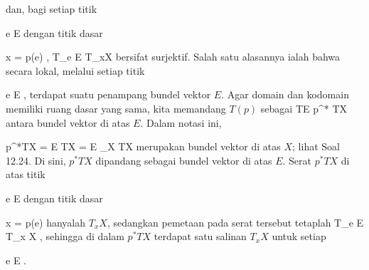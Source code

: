 dan, bagi setiap titik

\mavergleichskette
{\vergleichskette
{ e
}
{ \in }{ E
}
{  }{
}
{    }{
}
{   }{
}
}
{}{}{}
dengan titik dasar

\mavergleichskette
{\vergleichskette
{ x
}
{ = }{ p(e)
}
{  }{
}
{    }{
}
{   }{
}
}
{}{}{,}
 {T_e E} { T_{x}X
} {}
bersifat surjektif. Salah satu alasannya ialah bahwa secara lokal, melalui setiap titik

\mavergleichskette
{\vergleichskette
{ e
}
{ \in }{ E
}
{  }{
}
{    }{
}
{   }{
}
}
{}{}{,}
terdapat suatu penampang bundel vektor $E$. Agar domain dan kodomain memiliki ruang dasar yang sama, kita memandang $T(p)$ sebagai
 {TE} { p^* TX
} {}
antara bundel vektor di atas $E$. Dalam notasi ini,

\mavergleichskettedisp
{\vergleichskette
{ p^*TX
}
{ =} { E \oplus TX
}
{ =} { E \times_X TX
}
{ } {
}
{ } {
}
}
{}{}{}
merupakan
bundel vektor di atas $X$; lihat
Soal 12.24.
Di sini, $p^*TX$ dipandang sebagai bundel vektor di atas $E$. Serat $p^*TX$ di atas titik

\mavergleichskette
{\vergleichskette
{ e
}
{ \in }{ E
}
{  }{
}
{    }{
}
{   }{
}
}
{}{}{}
dengan titik dasar

\mavergleichskette
{\vergleichskette
{ x
}
{ = }{ p(e)
}
{  }{
}
{    }{
}
{   }{
}
}
{}{}{}
hanyalah $T_{x}X$, sedangkan pemetaan pada serat tersebut tetaplah
 { T_e E } { T_{x} X
} {,}
sehingga di dalam $p^*TX$ terdapat satu salinan $T_{x} X$ untuk setiap

\mavergleichskette
{\vergleichskette
{ e
}
{ \in }{ E
}
{  }{
}
{    }{
}
{   }{
}
}
{}{}{.}

